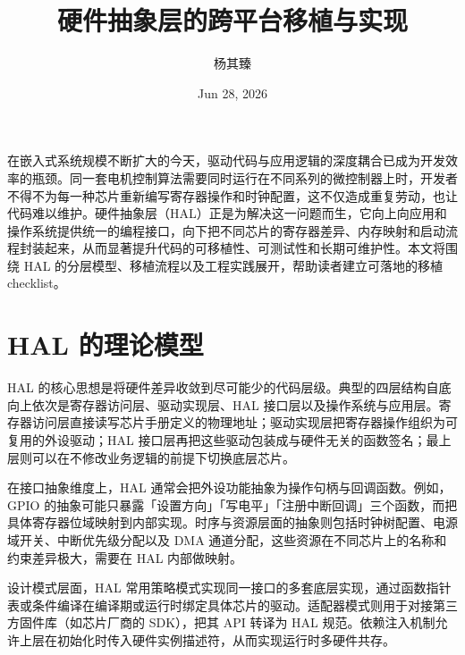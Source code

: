 \title{硬件抽象层的跨平台移植与实现}
\author{杨其臻}
\date{Jun 28, 2026}
\maketitle
在嵌入式系统规模不断扩大的今天，驱动代码与应用逻辑的深度耦合已成为开发效率的瓶颈。同一套电机控制算法需要同时运行在不同系列的微控制器上时，开发者不得不为每一种芯片重新编写寄存器操作和时钟配置，这不仅造成重复劳动，也让代码难以维护。硬件抽象层（HAL）正是为解决这一问题而生，它向上向应用和操作系统提供统一的编程接口，向下把不同芯片的寄存器差异、内存映射和启动流程封装起来，从而显著提升代码的可移植性、可测试性和长期可维护性。本文将围绕 HAL 的分层模型、移植流程以及工程实践展开，帮助读者建立可落地的移植 checklist。\par
\chapter{HAL 的理论模型}
HAL 的核心思想是将硬件差异收敛到尽可能少的代码层级。典型的四层结构自底向上依次是寄存器访问层、驱动实现层、HAL 接口层以及操作系统与应用层。寄存器访问层直接读写芯片手册定义的物理地址；驱动实现层把寄存器操作组织为可复用的外设驱动；HAL 接口层再把这些驱动包装成与硬件无关的函数签名；最上层则可以在不修改业务逻辑的前提下切换底层芯片。\par
在接口抽象维度上，HAL 通常会把外设功能抽象为操作句柄与回调函数。例如，GPIO 的抽象可能只暴露「设置方向」「写电平」「注册中断回调」三个函数，而把具体寄存器位域映射到内部实现。时序与资源层面的抽象则包括时钟树配置、电源域开关、中断优先级分配以及 DMA 通道分配，这些资源在不同芯片上的名称和约束差异极大，需要在 HAL 内部做映射。\par
设计模式层面，HAL 常用策略模式实现同一接口的多套底层实现，通过函数指针表或条件编译在编译期或运行时绑定具体芯片的驱动。适配器模式则用于对接第三方固件库（如芯片厂商的 SDK），把其 API 转译为 HAL 规范。依赖注入机制允许上层在初始化时传入硬件实例描述符，从而实现运行时多硬件共存。\par
